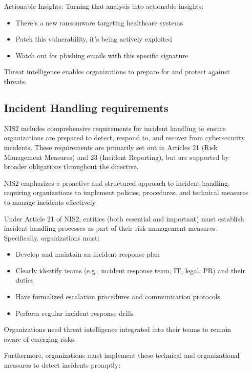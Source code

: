 Actionable Insights: Turning that analysis into actionable insights:
\begin{itemize}
    \item There's a new ransomware targeting healthcare systems
    \item Patch this vulnerability, it's being actively exploited
    \item Watch out for phishing emails with this specific signature
\end{itemize}

Threat intelligence enables organizations to prepare for and protect against threats.

\subsection{Incident Handling requirements}

NIS2 includes comprehensive requirements for incident handling to ensure organizations are prepared to detect, respond to, and recover from cybersecurity incidents. These requirements are primarily set out in Articles 21 (Risk Management Measures) and 23 (Incident Reporting), but are supported by broader obligations throughout the directive.

NIS2 emphasizes a proactive and structured approach to incident handling, requiring organizations to implement policies, procedures, and technical measures to manage incidents effectively.

Under Article 21 of NIS2, entities (both essential and important) must establish incident-handling processes as part of their risk management measures. Specifically, organizations must:

\begin{itemize}
    \item Develop and maintain an incident response plan
    \item Clearly identify teams (e.g., incident response team, IT, legal, PR) and their duties
    \item Have formalized escalation procedures and communication protocols
    \item Perform regular incident response drills
\end{itemize}

Organizations need threat intelligence integrated into their teams to remain aware of emerging risks.

Furthermore, organizations must implement these technical and organizational measures to detect incidents promptly:


